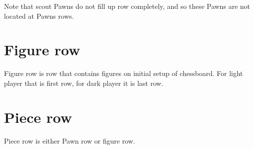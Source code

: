 Note that scout Pawns do not fill up row completely, and so these Pawns are
not located at Pawns rows.

\section*{Figure row}
\label{sec:Terms/Figure row}
Figure row is row that contains figures on initial setup of chessboard.
For light player that is first row, for dark player it is last row.

\section*{Piece row}
\label{sec:Terms/Piece row}
Piece row is either Pawn row or figure row.

\clearpage %
